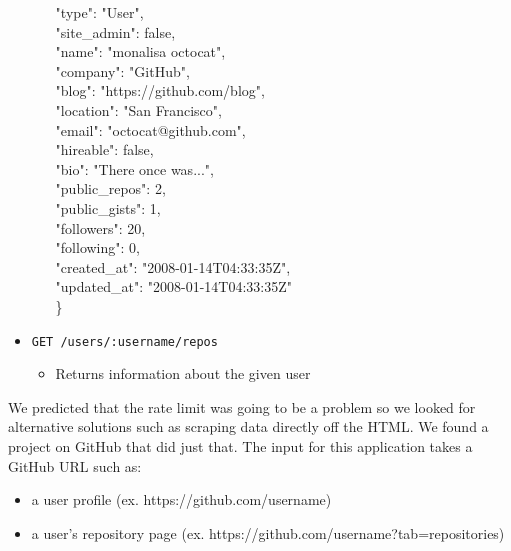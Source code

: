 \documentclass[11pt]{article}
\begin{document}
\begin{itemize}
\begin{itemize}
{{			  \textcolor{r}{"type"}: \textcolor{b}{"User"},\\
			  \textcolor{r}{"site\_admin"}: \textcolor{b}{false},\\
			  \textcolor{r}{"name"}: \textcolor{b}{"monalisa octocat"},\\
			  \textcolor{r}{"company"}: \textcolor{b}{"GitHub"},\\
			  \textcolor{r}{"blog"}: \textcolor{b}{"https://github.com/blog"},\\
			  \textcolor{r}{"location"}: \textcolor{b}{"San Francisco"},\\
			  \textcolor{r}{"email"}: \textcolor{b}{"octocat@github.com"},\\
			  \textcolor{r}{"hireable"}: \textcolor{b}{false},\\
			  \textcolor{r}{"bio"}: \textcolor{b}{"There once was..."},\\
			  \textcolor{r}{"public\_repos"}: \textcolor{b}{2},\\
			  \textcolor{r}{"public\_gists"}: \textcolor{b}{1},\\
			  \textcolor{r}{"followers"}: \textcolor{b}{20},\\
			  \textcolor{r}{"following"}: \textcolor{b}{0},\\
			  \textcolor{r}{"created\_at"}: \textcolor{b}{"2008-01-14T04:33:35Z"},\\
			  \textcolor{r}{"updated\_at"}: "\textcolor{b}{2008-01-14T04:33:35Z"}\\
			}
		\}
   	   }
	\end{itemize}
   \item{\texttt{GET /users/:username/repos}}
	\begin{itemize}
	   \item{Returns information about the given user}
	\end{itemize}
\end{itemize}

We predicted that the rate limit was going to be a problem so we looked for alternative solutions such as scraping data directly off the HTML. We found a project on GitHub that did just that. The input for this application takes a GitHub URL such as:
\begin{itemize}
\item{a user profile (ex. https://github.com/username)}
\item{a user's repository page (ex. https://github.com/username?tab=repositories)}
\end{itemize}
\end{document}
